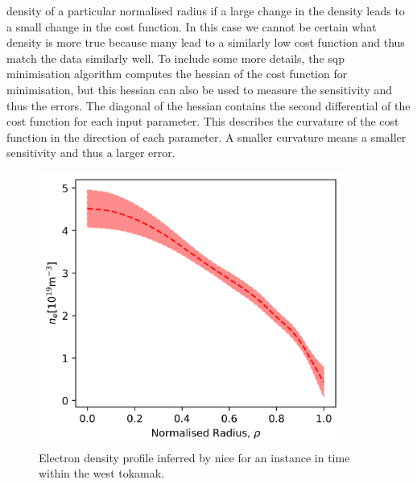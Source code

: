 density of a particular normalised radius if a large change in the density leads to a small change in the cost function. In this case we cannot be certain what density is more true because many lead to a similarly low cost function and thus match the data similarly well. To include some more details, the \gls{sqp} minimisation algorithm computes the hessian of the cost function for minimisation, but this hessian can also be used to measure the sensitivity and thus the errors. The diagonal of the hessian contains the second differential of the cost function for each input parameter. This describes the curvature of the cost function in the direction of each parameter. A smaller curvature means a smaller sensitivity and thus a larger error.

\begin{figure}
  \centering
  \includegraphics[width=10cm]{images/niceExample.png}
  \caption{Electron density profile inferred by \gls{nice} for an instance in time within the \gls{west} tokamak.}
  \label{fig:nice_example}
\end{figure}

